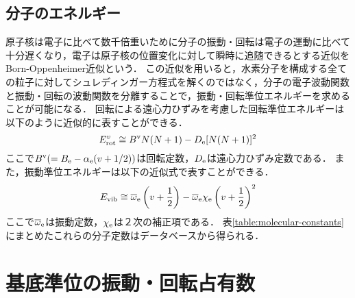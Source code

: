 \subsection{分子のエネルギー}
原子核は電子に比べて数千倍重いために分子の振動・回転は電子の運動に比べて十分遅くなり，電子は原子核の位置変化に対して瞬時に追随できるとする近似をBorn-Oppenheimer近似という\cite{bunsibunko-no-kiso}．
この近似を用いると，水素分子を構成する全ての粒子に対してシュレディンガー方程式を解くのではなく，分子の電子波動関数と振動・回転の波動関数を分離することで，振動・回転準位エネルギーを求めることが可能になる．
回転による遠心力ひずみを考慮した回転準位エネルギーは以下のように近似的に表すことができる．
\begin{equation}
    E^v_{\rm rot} \cong B^{\rm v} N (N+1) - D_{\rm e} [N(N+1)]^2
\end{equation}
ここで$B^{\rm v} (=B_{\rm e} - \alpha_{\rm e} (v + 1/2))$は回転定数，$D_{\rm e}$は遠心力ひずみ定数である．
また，振動準位エネルギーは以下の近似式で表すことができる．
\begin{equation}
    E_{\rm vib} \cong \overline{\omega}_{\rm e} \left(v + \frac{1}{2} \right) - \overline{\omega}_{\rm e} \chi_{\rm e} \left(v + \frac{1}{2} \right)^2
\end{equation}
ここで$\overline{\omega}_{\rm e}$は振動定数，$\chi_{\rm e}$は２次の補正項である．
表\ref{table:molecular-constants}にまとめたこれらの分子定数はデータベースから得られる\cite{nist}．

\section{基底準位の振動・回転占有数}
